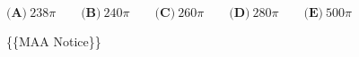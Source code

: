 \documentclass{article}
\begin{document}
\begin{enumerate}[label=\arabic*., itemsep=0.5em]
\( \textbf{(A)}\ 238\pi\qquad\textbf{(B)}\ 240\pi\qquad\textbf{(C)}\ 260\pi\qquad\textbf{(D)}\ 280\pi\qquad\textbf{(E)}\ 500\pi \)



\{\{MAA Notice\}\}\par \vspace{0.5em}
\end{enumerate}
\end{document}
